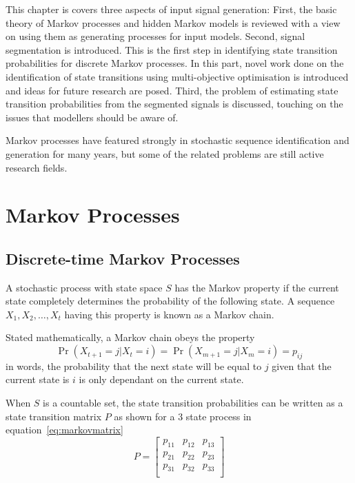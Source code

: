 This chapter is covers three aspects of input signal generation:
First, the basic theory of Markov processes and hidden Markov models
is reviewed with a view on using them as generating processes for
input models. Second, signal segmentation is introduced.  This is the
first step in identifying state transition probabilities for discrete
Markov processes.  In this part, novel work done on the identification
of state transitions using multi-objective optimisation is introduced
and ideas for future research are posed. Third, the problem of
estimating state transition probabilities from the segmented signals
is discussed, touching on the issues that modellers should be aware
of.

Markov processes have featured strongly in stochastic sequence
identification and generation for many years, but some of the related
problems are still active research fields.

\section{Markov Processes}
\subsection{Discrete-time Markov Processes}
A stochastic process with state space $S$ has the Markov
property if the current state completely determines the probability of
the following state.  A sequence $X_1,X_2, \dots ,X_t$ having this
property is known as a Markov chain.

Stated mathematically, a Markov chain obeys the property
\begin{equation}
  \label{eq:markovproperty}
  \Pr(X_{t+1} = j|X_{t}=i) = \Pr(X_{m+1}=j|X_{m}=i)=p_{ij}
\end{equation}
in words, the probability that the next state will be equal to $j$ given
that the current state is $i$ is only dependant on the current state.

When $S$ is a countable set, the state transition probabilities can be written 
as a state transition matrix $P$ as shown for a 3 state process in
equation~\ref{eq:markovmatrix}
\begin{equation}
\label{eq:markovmatrix}
P = \left[ 
  \begin{array}{cccc}
    p_{11} & p_{12} & p_{13}\\
    p_{21} & p_{22} & p_{23}\\
    p_{31} & p_{32} & p_{33}\\
  \end{array} \right ]
\end{equation}


